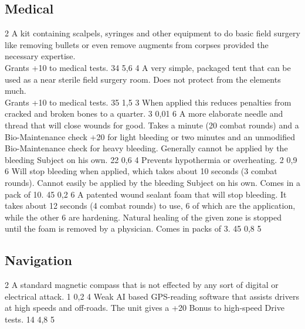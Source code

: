 \subsection{Medical}
\vspace{10mm}
\begin{multicols}{2}
    {A kit containing scalpels, syringes and other equipment to do basic field surgery
        like removing bullets or even remove augments from corpses provided the necessary expertise.\\
        Grants +10 to medical tests.}
    {34}
    {5,6}
    {4}
    {A very simple, packaged tent that can be used as a near sterile field surgery room.
        Does not protect from the elements much.\\
        Grants +10 to medical tests.}
    {35}
    {1,5}
    {3}
    {When applied this reduces penalties from cracked and broken bones to a quarter.}
    {3}
    {0,01}
    {6}
    {A more elaborate needle and thread that will close wounds for good.
        Takes a minute (20 combat rounds) and a Bio-Maintenance check +20 for light bleeding
        or two minutes and an unmodified Bio-Maintenance check for heavy bleeding.
        Generally cannot be applied by the bleeding Subject on his own.}
    {22}
    {0,6}
    {4}
    {Prevents hypothermia or overheating.}
    {2}
    {0,9}
    {6}
    {
        Will stop bleeding when applied,
        which takes about 10 seconds (3 combat rounds).
        Cannot easily be applied by the bleeding Subject on his own.
        Comes in a pack of 10.}
    {45}
    {0,2}
    {6}
    {
        A patented wound sealant foam that will stop bleeding.
        It takes about 12 seconds (4 combat rounds) to use,
        6 of which are the application,
        while the other 6 are hardening.
        Natural healing of the given zone is stopped until the foam is removed by a physician.
        Comes in packs of 3.}
    {45}
    {0,8}
    {5}
\end{multicols}

\subsection{Navigation}
\vspace{10mm}
\begin{multicols}{2}
    {A standard magnetic compass
        that is not effected by any sort of digital or electrical attack.}
    {1}
    {0,2}
    {4}
    {Weak AI based GPS-reading software that assists drivers at high speeds and off-roads.
        The unit gives a +20 Bonus to high-speed Drive tests.}
    {14}
    {4,8}
    {5}
\end{multicols}

